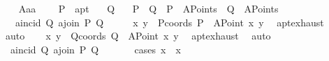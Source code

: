 \begin{isabellebody}
\ \ \isamarkupfalse%
\isanewline
{}\isamarkupfalse%
%
\endisatagproof
{\isafoldproof}%
%
\isadelimproof
\isanewline
%
\endisadelimproof
\isanewline
{}\isamarkupfalse%
\ A{}{\isacharunderscore}{\kern0pt}a{}a{}{\isacharcolon}{\kern0pt}\ \isanewline
\ \ \ P\ {\isacharcolon}{\kern0pt}{\isacharcolon}{\kern0pt}\ a{}pt\isanewline
\ \ \ Q\isanewline
\ \ \ {\isachardoublequoteopen}P\ {\isasymnoteq}\ Q{\isachardoublequoteclose}\ \ {\isachardoublequoteopen}P\ {\isasymin}\ A{}Points{\isachardoublequoteclose}\ \ {\isachardoublequoteopen}Q\ {\isasymin}\ A{}Points{\isachardoublequoteclose}\isanewline
\ \ \ {\isachardoublequoteopen}a{}incid\ Q\ {\isacharparenleft}{\kern0pt}a{}join\ P\ Q{\isacharparenright}{\kern0pt}{\isachardoublequoteclose}\isanewline
%
\isadelimproof
%
\endisadelimproof
%
\isatagproof
{}\isamarkupfalse%
\ {\isacharminus}{\kern0pt}\isanewline
\ \ \isamarkupfalse%
\ x{}\ y{}\ \ Pcoords{\isacharcolon}{\kern0pt}\ {\isachardoublequoteopen}P\ {\isacharequal}{\kern0pt}\ {\isacharparenleft}{\kern0pt}A{}Point\ x{}\ y{}{\isacharparenright}{\kern0pt}{\isachardoublequoteclose}\ \isamarkupfalse%
\ a{}pt{\isachardot}{\kern0pt}exhaust\ \isamarkupfalse%
\ auto\isanewline
\ \ \isamarkupfalse%
\ x{}\ y{}\ \ Qcoords{\isacharcolon}{\kern0pt}\ {\isachardoublequoteopen}Q\ {\isacharequal}{\kern0pt}\ {\isacharparenleft}{\kern0pt}A{}Point\ x{}\ y{}{\isacharparenright}{\kern0pt}{\isachardoublequoteclose}\ \isamarkupfalse%
\ a{}pt{\isachardot}{\kern0pt}exhaust\ \isamarkupfalse%
\ auto\isanewline
\ \ \isamarkupfalse%
\ {}{\isacharcolon}{\kern0pt}\ {\isachardoublequoteopen}a{}incid\ Q\ {\isacharparenleft}{\kern0pt}a{}join\ P\ Q{\isacharparenright}{\kern0pt}{\isachardoublequoteclose}\ \isanewline
\ \ \ \ \isamarkupfalse%
\ {\isacharparenleft}{\kern0pt}cases\ {\isachardoublequoteopen}{\isacharparenleft}{\kern0pt}x{}\ {\isacharequal}{\kern0pt}\ x{}{\isacharparenright}{\kern0pt}{\isachardoublequoteclose}{\isacharparenright}{\kern0pt}\isanewline

\end{isabellebody}

